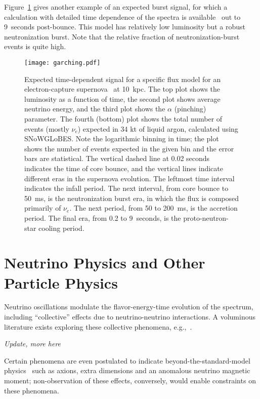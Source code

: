 Figure~\ref{fig:garching} gives another example of an expected burst
signal, for which a calculation with detailed time dependence of the
spectra is available~\cite{Huedepohl:2009wh} out to 9~seconds
post-bounce.  This model has relatively low luminosity but a robust
neutronization burst.  Note that the relative fraction of
neutronization-burst events is quite high.
%
\begin{figure}[!htb]
\centering
\texttt{[image: garching.pdf]}
\caption[Garching flux signal with neutronization burst]{ Expected
  time-dependent signal for a specific flux model for an
  electron-capture supernova~\cite{Huedepohl:2009wh} at 10~kpc.  The
  top plot shows the luminosity as a function of time, the second plot
  shows average neutrino energy, and the third plot shows the $\alpha$
  (pinching) parameter.  The fourth (bottom) plot shows the total number of
  events (mostly $\nu_e$) expected in 34 kt of liquid argon, calculated using
  SNoWGLoBES.  Note the logarithmic binning in time; the plot shows
  the number of events expected in the given bin and the error bars
  are statistical. The vertical dashed line at 0.02 seconds indicates
  the time of core bounce, and the vertical lines indicate different
  eras in the supernova evolution.  The leftmost time interval
  indicates the infall period.  The next interval, from core bounce to
  50~ms, is the neutronization burst era, in which the flux is
  composed primarily of $\nu_e$.  The next period, from 50 to 200~ms,
  is the accretion period. The final era, from 0.2 to 9~seconds, is
  the proto-neutron-star cooling period.  }
\label{fig:garching}
\end{figure}


\section{Neutrino Physics and Other Particle Physics}
\label{sec:physics-snblowe-neutrino-physics}


Neutrino oscillations modulate the flavor-energy-time evolution of the spectrum, including 
``collective'' effects due to neutrino-neutrino interactions.  A
voluminous literature exists exploring these collective phenomena,
e.g.,~\cite{Duan:2005cp,Fogli:2007bk,Raffelt:2007cb,Raffelt:2007xt,EstebanPretel:2008ni,Duan:2009cd,Dasgupta:2009mg,Duan:2010bg,Duan:2010bf}.

\textit{Update, more here}

Certain phenomena are even postulated to indicate
beyond-the-standard-model physics~\cite{Raffelt:1999tx} such as
axions, extra dimensions and an anomalous neutrino magnetic moment;
non-observation of these effects, conversely, would enable constraints
on these phenomena.


